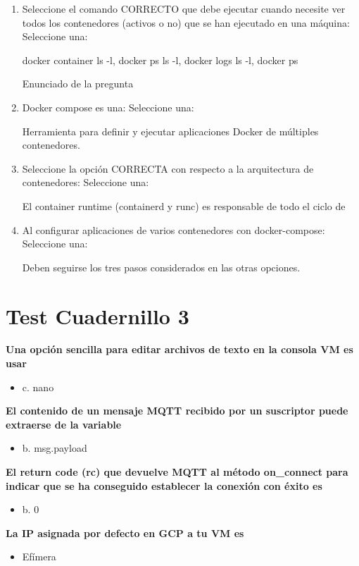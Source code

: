 \documentclass[12pt, twoside, openright]{report} %
\begin{document}
\begin{enumerate}
	\item Seleccione el comando CORRECTO que debe ejecutar cuando necesite ver todos los contenedores (activos o no) que se han ejecutado en una máquina:
	      Seleccione una:

	      docker container ls -l, docker ps ls -l, docker logs ls -l, docker ps

	      Enunciado de la pregunta
	\item Docker compose es una:
	      Seleccione una:

	      Herramienta para definir y ejecutar aplicaciones Docker de múltiples contenedores.

	\item Seleccione la opción CORRECTA con respecto a la arquitectura de contenedores:
	      Seleccione una:

	      El container runtime (containerd y runc) es responsable de todo el ciclo de

	\item Al configurar aplicaciones de varios contenedores con docker-compose:
	      Seleccione una:

	      Deben seguirse los tres pasos considerados en las otras opciones.
\end{enumerate}
\pagebreak

\section{Test Cuadernillo 3}

\textbf{Una opción sencilla para editar archivos de texto en la consola VM es usar}
\begin{itemize}
	\item c. nano
\end{itemize}

\textbf{El contenido de un mensaje MQTT recibido por un suscriptor puede extraerse de la variable}
\begin{itemize}
	\item b. msg.payload
\end{itemize}

\textbf{El return code (rc) que devuelve MQTT al método on\_connect para indicar que se ha conseguido establecer la conexión con éxito es}
\begin{itemize}
	\item b. 0
\end{itemize}

\textbf{La IP asignada por defecto en GCP a tu VM es}
\begin{itemize}
	\item Efímera
\end{itemize}
\end{document}
